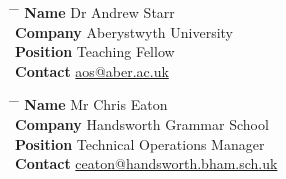\documentclass[10pt]{article} %
\begin{document}
\parbox{0.5\textwidth}{ %
\begin{tabbing}
\hspace{2.75cm} \= \hspace{4cm} \= \kill %
{\bf Name} \> Dr Andrew Starr\\ %
{\bf Company} \> Aberystwyth University \\ %
{\bf Position} \>  Teaching Fellow \\ %
{\bf Contact} \> \href{mailto:aos@aber.ac.uk}{aos@aber.ac.uk} %
\end{tabbing}}
\hfill %
\parbox{0.5\textwidth}{ %
\begin{tabbing}
\hspace{2.75cm} \= \hspace{4cm} \= \kill %
{\bf Name} \> Mr Chris Eaton\\ %
{\bf Company} \> Handsworth Grammar School \\ %
{\bf Position} \> Technical Operations Manager \\ %
{\bf Contact} \> \href{mailto:ceaton@handsworth.bham.sch.uk}{ceaton@handsworth.bham.sch.uk} %
\end{tabbing}}
\end{document}
